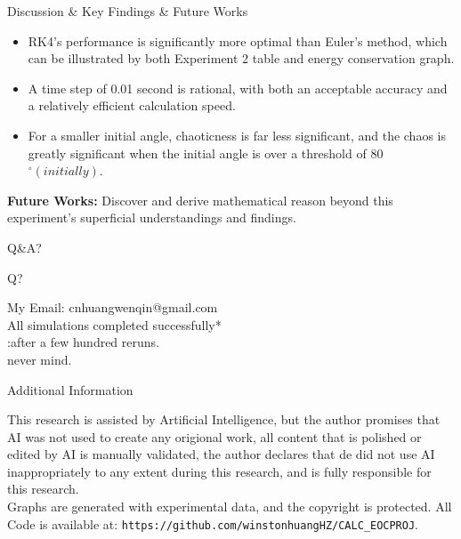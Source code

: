 \documentclass[aspectratio=169, 12pt]{beamer}
\begin{document}
\begin{frame}{Discussion \& Key Findings \& Future Works}

	\begin{itemize}
		\item RK4's performance is significantly more optimal than Euler's method, which can be illustrated by both Experiment 2 table and energy conservation graph.
		\item A time step of 0.01 second is rational, with both an acceptable accuracy and a relatively efficient calculation speed.
		\item For a smaller initial angle, chaoticness is far less significant, and the chaos is greatly significant when the initial angle is over a threshold of 80$^{\circ} (initially).$
	\end{itemize}
	\vspace{0.5em}
	\textbf{Future Works:} Discover and derive mathematical reason beyond this experiment's superficial understandings and findings.

\end{frame}

\begin{frame}{Q\&A?}

	\begin{center}
		\Huge Q?

		\vspace{.5em}
		\tiny My Email: cnhuangwenqin@gmail.com \\
		\tiny All simulations completed successfully* \\
		\tiny *:after a few hundred reruns. \\
		\TINY never mind.
	\end{center}

\end{frame}


\begin{frame}{Additional Information}

	This research is assisted by Artificial Intelligence, but the author promises that AI was not used to create any origional work, all content that is polished or edited by AI is manually validated, the author declares that de did not use AI inappropriately to any extent during this research, and is fully responsible for this research. \\
	\vspace{1em}
	Graphs are generated with experimental data, and the copyright is protected.
	\vspace{1em}
	All Code is available at: \texttt{https://github.com/winstonhuangHZ/CALC\_EOCPROJ}.

\end{frame}
\end{document}
